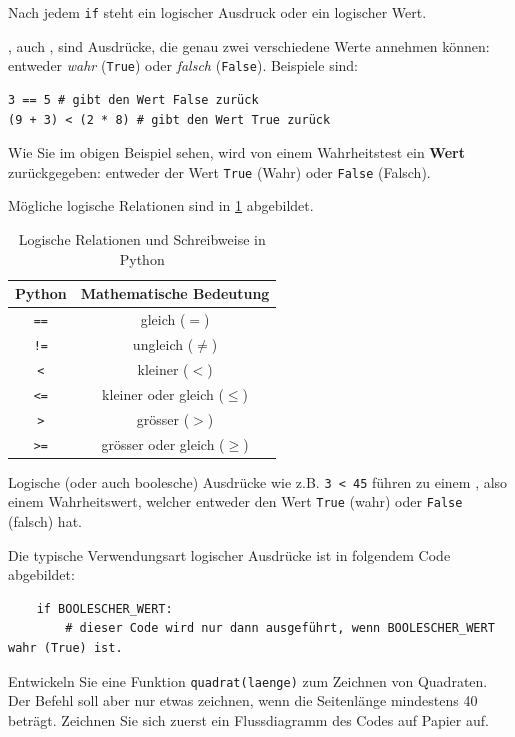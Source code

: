 Nach jedem \lstinline|if| steht ein logischer Ausdruck oder ein logischer Wert.

\begin{mydefinition}
, auch , sind Ausdrücke, die genau zwei verschiedene Werte annehmen können: entweder \textit{wahr} (\lstinline|True|) oder \textit{falsch} (\lstinline|False|). Beispiele sind:
\begin{lstlisting}
3 == 5 # gibt den Wert False zurück
(9 + 3) < (2 * 8) # gibt den Wert True zurück
\end{lstlisting}

Wie Sie im obigen Beispiel sehen, wird von einem Wahrheitstest ein \textbf{Wert} zurückgegeben: entweder der Wert \lstinline|True| (Wahr) oder \lstinline|False| (Falsch).

Mögliche logische Relationen sind in \cref{table:bool} abgebildet.
\begin{table}[H]
	\centering
	\begin{tabular}{cc}
		\textbf{Python} & \textbf{Mathematische Bedeutung} \\\midrule
		\lstinline|==|  & gleich ($=$)                     \\
		\lstinline|!=|  & ungleich ($\neq$)                \\
		\lstinline|<|   & kleiner ($<$)                    \\
		\lstinline|<=|  & kleiner oder gleich ($\leq$)     \\
		\lstinline|>|   & grösser ($>$)                    \\
		\lstinline|>=|  & grösser oder gleich ($\geq$)
	\end{tabular}
	\caption{Logische Relationen und Schreibweise in Python}
	\label{table:bool}
\end{table}
Logische (oder auch boolesche) Ausdrücke wie z.B. \lstinline|3 < 45| führen zu einem , also einem Wahrheitswert, welcher entweder den Wert \lstinline|True| (wahr) oder \lstinline|False| (falsch) hat.

Die typische Verwendungsart logischer Ausdrücke ist in folgendem Code abgebildet:
\begin{lstlisting}
	if BOOLESCHER_WERT:
		# dieser Code wird nur dann ausgeführt, wenn BOOLESCHER_WERT wahr (True) ist.
\end{lstlisting}
\end{mydefinition}



\begin{myexercise}
	Entwickeln Sie eine Funktion \lstinline|quadrat(laenge)| zum Zeichnen von Quadraten. Der Befehl soll aber nur etwas zeichnen, wenn die Seitenlänge mindestens 40 beträgt. Zeichnen Sie sich zuerst ein Flussdiagramm des Codes auf Papier auf.
	\begin{myanswer}
		
	\end{myanswer}
\end{myexercise}

